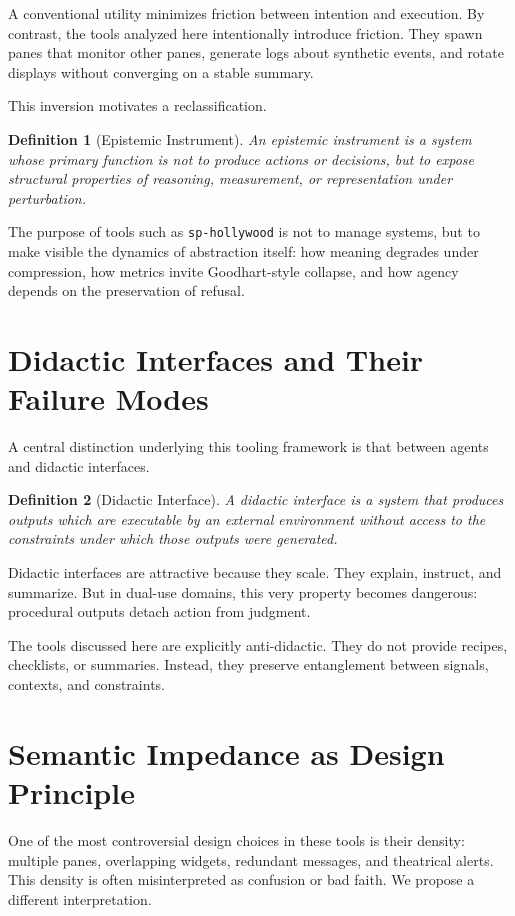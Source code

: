 \documentclass[11pt]{article}
\newtheorem{definition}{Definition}
\begin{document}
A conventional utility minimizes friction between intention and execution. By
contrast, the tools analyzed here intentionally introduce friction. They spawn
panes that monitor other panes, generate logs about synthetic events, and rotate
displays without converging on a stable summary.

This inversion motivates a reclassification.

\begin{definition}[Epistemic Instrument]
An epistemic instrument is a system whose primary function is not to produce
actions or decisions, but to expose structural properties of reasoning,
measurement, or representation under perturbation.
\end{definition}

The purpose of tools such as \texttt{sp-hollywood} is not to manage systems, but
to make visible the dynamics of abstraction itself: how meaning degrades under
compression, how metrics invite Goodhart-style collapse, and how agency depends
on the preservation of refusal.

\section{Didactic Interfaces and Their Failure Modes}

A central distinction underlying this tooling framework is that between agents
and didactic interfaces.

\begin{definition}[Didactic Interface]
A didactic interface is a system that produces outputs which are executable by
an external environment without access to the constraints under which those
outputs were generated.
\end{definition}

Didactic interfaces are attractive because they scale. They explain, instruct,
and summarize. But in dual-use domains, this very property becomes dangerous:
procedural outputs detach action from judgment.

The tools discussed here are explicitly anti-didactic. They do not provide
recipes, checklists, or summaries. Instead, they preserve entanglement between
signals, contexts, and constraints.

\section{Semantic Impedance as Design Principle}

One of the most controversial design choices in these tools is their density:
multiple panes, overlapping widgets, redundant messages, and theatrical alerts.
This density is often misinterpreted as confusion or bad faith. We propose a
different interpretation.
\end{document}
